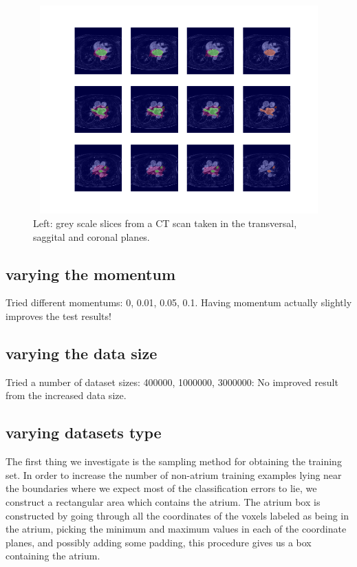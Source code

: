 \begin{figure}
\centering
\includegraphics[trim=2.5cm 1.5cm 2cm 1.5cm, clip=true, height=80mm, width=150mm]{Chapter3/mask_results_varying_learning_rate.png}
\caption{Left: grey scale slices from a CT scan taken in the transversal, saggital and coronal planes.}
\end{figure}

\subsection{varying the momentum}

\noindent Tried different momentums: 0, 0.01, 0.05, 0.1. Having momentum actually slightly improves the test results!



\subsection{varying the data size}

\noindent Tried a number of dataset sizes: 400000, 1000000, 3000000: No improved result from the increased data size.

\subsection{varying datasets type}

\noindent The first thing we investigate is the sampling method for obtaining the training set. In order to increase the number of non-atrium training examples lying near the boundaries where we expect most of the classification errors to lie, we construct a rectangular area which contains the atrium. The atrium box is constructed by going through all the coordinates of the voxels labeled as being in the atrium, picking the minimum and maximum values in each of the coordinate planes, and possibly adding some padding, this procedure gives us a box containing the atrium. \\

